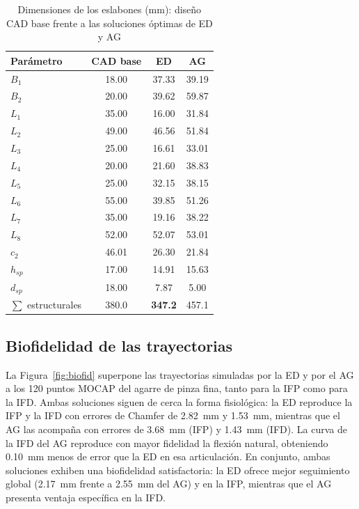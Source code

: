 \documentclass[conference]{IEEEtran}
\begin{document}
\begin{table}[htbp]
\caption{Dimensiones de los eslabones (mm): diseño CAD base frente a las
soluciones óptimas de ED y AG}
\begin{center}
\begin{tabular}{|l|c|c|c|}
\hline
\textbf{Parámetro} & \textbf{CAD base} & \textbf{ED} & \textbf{AG} \\
\hline
$B_1$  & 18.00 & 37.33 & 39.19 \\
\hline
$B_2$  & 20.00 & 39.62 & 59.87 \\
\hline
$L_1$  & 35.00 & 16.00 & 31.84 \\
\hline
$L_2$  & 49.00 & 46.56 & 51.84 \\
\hline
$L_3$  & 25.00 & 16.61 & 33.01 \\
\hline
$L_4$  & 20.00 & 21.60 & 38.83 \\
\hline
$L_5$  & 25.00 & 32.15 & 38.15 \\
\hline
$L_6$  & 55.00 & 39.85 & 51.26 \\
\hline
$L_7$  & 35.00 & 19.16 & 38.22 \\
\hline
$L_8$  & 52.00 & 52.07 & 53.01 \\
\hline
$c_2$  & 46.01 & 26.30 & 21.84 \\
\hline
$h_{sp}$ & 17.00 & 14.91 & 15.63 \\
\hline
$d_{sp}$ & 18.00 & \phantom{0}7.87 & \phantom{0}5.00 \\
\hline
$\sum$ estructurales & 380.0 & \textbf{347.2} & 457.1 \\
\hline
\end{tabular}
\label{tab:dimensiones}
\end{center}
\end{table}

\subsection{Biofidelidad de las trayectorias}
La Figura~\ref{fig:biofid} superpone las trayectorias simuladas por la ED y por
el AG a los 120 puntos MOCAP del agarre de pinza fina, tanto para la IFP como
para la IFD. Ambas soluciones siguen de cerca la forma fisiológica: la ED
reproduce la IFP y la IFD con errores de Chamfer de 2.82~mm y 1.53~mm, mientras
que el AG las acompaña con errores de 3.68~mm (IFP) y 1.43~mm (IFD). La curva de
la IFD del AG reproduce con mayor fidelidad la flexión natural, obteniendo
0.10~mm menos de error que la ED en esa articulación. En conjunto, ambas
soluciones exhiben una biofidelidad satisfactoria: la ED ofrece mejor seguimiento
global (2.17~mm frente a 2.55~mm del AG) y en la IFP, mientras que el AG presenta
ventaja específica en la IFD.
\end{document}

